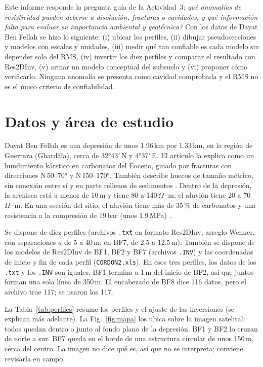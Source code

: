 \documentclass[conference]{IEEEtran}
\newcommand{\ohmm}{\ensuremath{\Omega\!\cdot\!\mathrm{m}}}
\begin{document}
Este informe responde la pregunta gu\'ia de la Actividad~3: \emph{\textquestiondown qu\'e anomal\'ias de resistividad pueden deberse a disoluci\'on, fracturas o cavidades, y qu\'e informaci\'on falta para evaluar su importancia ambiental y geot\'ecnica?} Con los datos de Dayat Ben Fellah \cite{melouah2016} se hizo lo siguiente: (i) ubicar los perfiles, (ii) dibujar pseudosecciones y modelos con escalas y unidades, (iii) medir qu\'e tan confiable es cada modelo sin depender solo del RMS, (iv) invertir los diez perfiles y comparar el resultado con Res2DInv, (v) armar un modelo conceptual del subsuelo y (vi) proponer c\'omo verificarlo. Ninguna anomal\'ia se presenta como cavidad comprobada y el RMS no es el \'unico criterio de confiabilidad.

\section{Datos y \'area de estudio}
Dayat Ben Fellah es una depresi\'on de unos 1.96\,km por 1.33\,km, en la regi\'on de Guerrara (Ghard\"a\"ia), cerca de 32°43$'$\,N y 4°37$'$\,E. El art\'iculo la explica como un hundimiento k\'arstico en carbonatos del Eoceno, guiado por fracturas con direcciones N\,50--70° y N\,150--170°. Tambi\'en describe huecos de tama\~no m\'etrico, sin conexi\'on entre s\'i y en parte rellenos de sedimentos \cite{melouah2016}. Dentro de la depresi\'on, la arenisca est\'a a menos de 10\,m y tiene 80 a 140\,\ohmm; el aluvi\'on tiene 20 a 70\,\ohmm. En una secci\'on del sitio, el aluvi\'on tiene m\'as de 35\,\% de carbonatos y una resistencia a la compresi\'on de 19\,bar (unos 1.9\,MPa) \cite{melouah2016}.

Se dispone de diez perfiles (archivos \texttt{.txt} en formato Res2DInv, arreglo Wenner, con separaciones $a$ de 5 a 40\,m; en BF7, de 2.5 a 12.5\,m). Tambi\'en se dispone de los modelos de Res2DInv de BF1, BF2 y BF7 (archivos \texttt{.INV}) y las coordenadas de inicio y fin de cada perfil (\texttt{CORDON2.xls}). En esos tres perfiles, los datos de los \texttt{.txt} y los \texttt{.INV} son iguales. BF1 termina a 1\,m del inicio de BF2, as\'i que juntos forman una sola l\'inea de 350\,m. El encabezado de BF8 dice 116 datos, pero el archivo trae 117; se usaron los 117.

La Tabla~\ref{tab:perfiles} resume los perfiles y el ajuste de las inversiones (se explican m\'as adelante). La Fig.~\ref{fig:mapa} los ubica sobre la imagen satelital: todos quedan dentro o junto al fondo plano de la depresi\'on. BF1 y BF2 lo cruzan de norte a sur. BF7 queda en el borde de una estructura circular de unos 150\,m, cerca del centro. La imagen no dice qu\'e es, as\'i que no se interpreta; conviene revisarla en campo.
\end{document}

